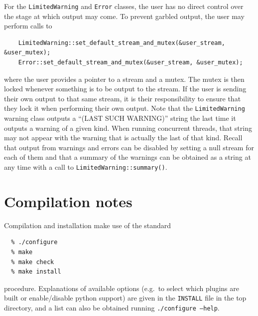 \documentclass[12pt,a4]{article}
\newcommand{\ttt}[1]{{\small\texttt{#1}}}
\begin{document}
For the \ttt{LimitedWarning} and \ttt{Error} classes, the user has no
direct control over the stage at which output may come.
%
To prevent garbled output, the user may perform calls to
\begin{lstlisting}
    LimitedWarning::set_default_stream_and_mutex(&user_stream, &user_mutex);
    Error::set_default_stream_and_mutex(&user_stream, &user_mutex);
\end{lstlisting}
where the user provides a pointer to a stream and a mutex.
%
The mutex is then locked whenever something is to be output to the
stream.
%
If the user is sending their own output to that same stream, it is
their responsibility to ensure that they lock it when performing their
own output.
%
Note that the \ttt{LimitedWarning} warning class outputs a ``(LAST
SUCH WARNING)'' string the last time it outputs a warning of a given
kind.
%
When running concurrent threads, that string may not appear with the
warning that is actually the last of that kind.
%
Recall that output from warnings and errors can be disabled by setting
a null stream for each of them and that a summary of the warnings can
be obtained as a string at any time with a call to
\ttt{LimitedWarning::summary()}. 

\section{Compilation notes}

Compilation and installation make use of the standard
\begin{verbatim}
  % ./configure
  % make
  % make check
  % make install
\end{verbatim}
procedure. Explanations of available options (e.g.\ to select which
plugins are built or enable/disable python support) are given in the
\ttt{INSTALL} file in the top directory, and a list can also be
obtained running \ttt{./configure --help}.
\end{document}
